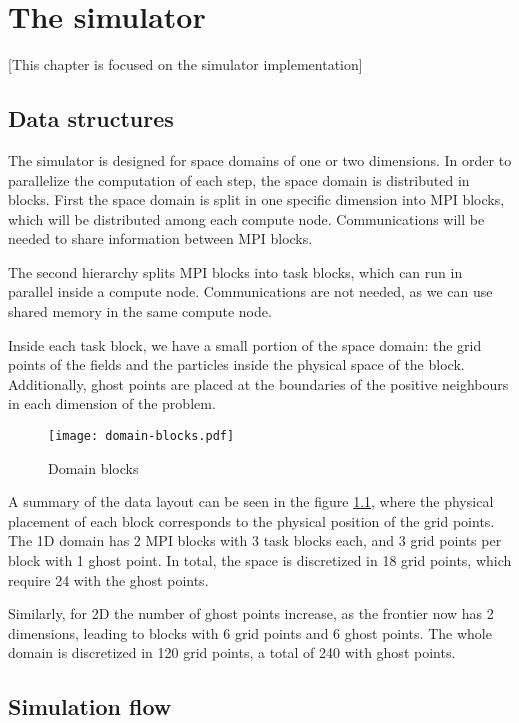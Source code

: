 \chapter{The simulator}

[This chapter is focused on the simulator implementation]

\section{Data structures}

The simulator is designed for space domains of one or two dimensions. In order 
to parallelize the computation of each step, the space domain is distributed in 
blocks. First the space domain is split in one specific dimension into MPI 
blocks, which will be distributed among each compute node. Communications will 
be needed to share information between MPI blocks.

The second hierarchy splits MPI blocks into task blocks, which can run in 
parallel inside a compute node. Communications are not needed, as we can use 
shared memory in the same compute node.

Inside each task block, we have a small portion of the space domain: the grid 
points of the fields and the particles inside the physical space of the block.  
Additionally, ghost points are placed at the boundaries of the positive 
neighbours in each dimension of the problem.


\begin{figure}[h]
	\centering
	\texttt{[image: domain-blocks.pdf]}
	\caption{Domain blocks}
	\label{fig:domain-blocks}
\end{figure}

A summary of the data layout can be seen in the figure \ref{fig:domain-blocks}, 
where the physical placement of each block corresponds to the physical position 
of the grid points. The 1D domain has 2 MPI blocks with 3 task blocks each, and 
3 grid points per block with 1 ghost point. In total, the space is discretized 
	in 18 grid points, which require 24 with the ghost points.

Similarly, for 2D the number of ghost points increase, as the frontier now has 2 
dimensions, leading to blocks with 6 grid points and 6 ghost points. The whole 
domain is discretized in 120 grid points, a total of 240 with ghost points.

\section{Simulation flow}

